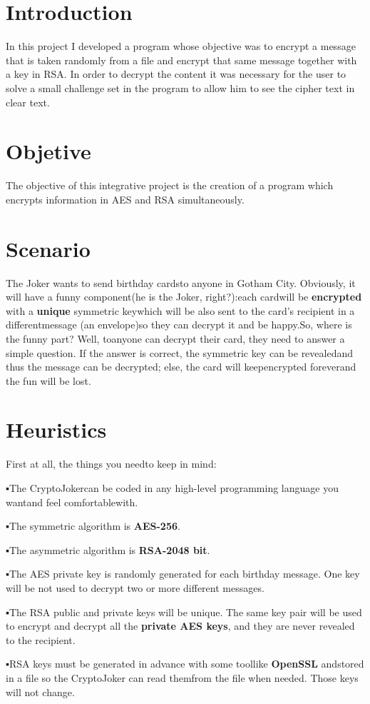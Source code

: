\documentclass[a4paper, table,12pt,xcdraw]{article} %
\begin{document}
	\section{Introduction}
	In this project I developed a program whose objective was to encrypt a message that is taken randomly from a file and encrypt that same message together with a key in RSA.
In order to decrypt the content it was necessary for the user to solve a small challenge set in the program to allow him to see the cipher text in clear text.

	\section{Objetive}

	The objective of this integrative project is the creation of a program which encrypts information in AES and RSA simultaneously.

	\section{Scenario}
	The Joker wants to send birthday cardsto anyone in Gotham City. Obviously, it will have a funny component(he is the Joker, right?):each cardwill be \textbf{encrypted} with a \textbf{unique} symmetric keywhich will be also sent to the card’s recipient in a differentmessage (an envelope)so they can decrypt it and be happy.So, where is the funny part? Well, toanyone can decrypt their card, they need to answer a simple question. If the answer is correct, the symmetric key can be revealedand thus the message can be decrypted; else, the card will keepencrypted foreverand the fun will be lost.


	\section{Heuristics}
	First at all, the things you needto keep in mind:
\par▪The CryptoJokercan be coded in any high-level programming language you wantand feel comfortablewith.
\par▪The symmetric algorithm is \textbf{AES-256}.
\par▪The asymmetric algorithm is \textbf{RSA-2048 bit}.
\par▪The AES private key is randomly generated for each birthday message. One key will be not used to decrypt two or more different messages.
\par▪The RSA public and private keys will be unique. The same key pair will be used to encrypt and decrypt all the \textbf{private AES keys}, and they are never revealed to the recipient.
\par▪RSA keys must be generated in advance with some toollike \textbf{OpenSSL} andstored in a file so the CryptoJoker can read themfrom the file when needed. Those keys will not change.
	\newpage
	\BgThispage
\end{document}
